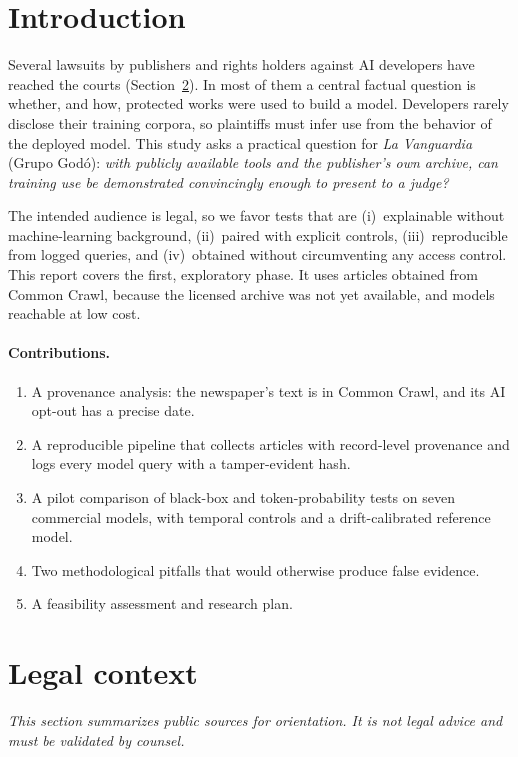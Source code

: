 \documentclass[10pt,a4paper]{article}
\begin{document}
\section{Introduction}
Several lawsuits by publishers and rights holders against AI developers have reached the courts
(Section~\ref{sec:legal}). In most of them a central factual question is whether, and how, protected works were
used to build a model. Developers rarely disclose their training corpora, so plaintiffs must infer use from the
behavior of the deployed model. This study asks a practical question for \emph{La Vanguardia} (Grupo God\'o):
\emph{with publicly available tools and the publisher's own archive, can training use be demonstrated
convincingly enough to present to a judge?}

The intended audience is legal, so we favor tests that are (i)~explainable without machine-learning background,
(ii)~paired with explicit controls, (iii)~reproducible from logged queries, and (iv)~obtained without circumventing
any access control. This report covers the first, exploratory phase. It uses articles obtained from Common Crawl,
because the licensed archive was not yet available, and models reachable at low cost.

\paragraph{Contributions.}
\begin{enumerate}[label=(\arabic*)]
\item A provenance analysis: the newspaper's text is in Common Crawl, and its AI opt-out has a precise date.
\item A reproducible pipeline that collects articles with record-level provenance and logs every model query with a
tamper-evident hash.
\item A pilot comparison of black-box and token-probability tests on seven commercial models, with temporal controls
and a drift-calibrated reference model.
\item Two methodological pitfalls that would otherwise produce false evidence.
\item A feasibility assessment and research plan.
\end{enumerate}

\section{Legal context}\label{sec:legal}
\emph{This section summarizes public sources for orientation. It is not legal advice and must be validated by
counsel.}
\end{document}
